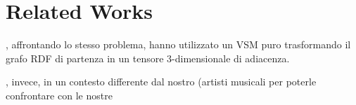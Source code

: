 \section{Related Works}
\label{relatedworks}

\citet{mirizzilinked}, affrontando lo stesso problema, hanno utilizzato un VSM puro trasformando il grafo RDF di partenza in un tensore 3-dimensionale di adiacenza.


\citet{passant2010measuring}, invece, in un contesto differente dal nostro (artisti musicali
per poterle confrontare con le nostre
